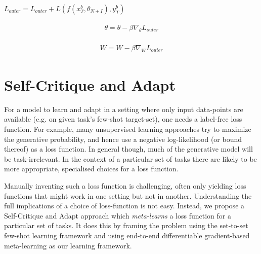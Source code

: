 \documentclass{article} \usepackage[dvipsnames]{xcolor}
\begin{document}
\begin{algorithm}
\begin{algorithmic}[1]
\State $L_{outer} = L_{outer} + L(f(x_{T}^b, \theta_{N+I}), y_{T}^b)$\label{maml_outer_objective}

\EndFor
\State \vspace*{-\baselineskip} \begin{fleqn} 
        \setlength\belowdisplayskip{0pt}
        \begin{gather} \label{maml_outer_update_base}
            \begin{multlined}
                \theta = \theta - \beta \nabla_{{\theta}} L_{outer}
            \end{multlined}
        \end{gather}
\end{fleqn}
\State \vspace*{-\baselineskip} \begin{fleqn}
        \setlength\belowdisplayskip{0pt}
        \begin{gather}  \label{maml_outer_update_critic}
            \begin{multlined}
                W = W - \beta \nabla_{{W}} L_{outer}
            \end{multlined}
        \end{gather}
\end{fleqn}
\end{algorithmic}
\end{algorithm}

\section{Self-Critique and Adapt}\label{section:model}
For a model to learn and adapt in a setting where only input data-points are available (e.g. on given task's few-shot target-set), one needs a label-free loss function. For example, many unsupervised learning approaches try to maximize the generative probability, and hence use a negative log-likelihood (or bound thereof) as a loss function. In general though, much of the generative model will be task-irrelevant. In the context of a particular set of tasks there are likely to be more appropriate, specialised choices for a loss function.

Manually inventing such a loss function is challenging, often only yielding loss functions that might work in one setting but not in another. Understanding the full implications of a choice of loss-function is not easy. Instead, we propose a Self-Critique and Adapt approach which \emph{meta-learns} a loss function for a particular set of tasks. It does this by framing the problem using the set-to-set few-shot learning framework and using end-to-end differentiable gradient-based meta-learning as our learning framework.
\end{document}
